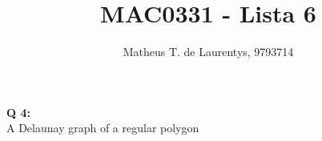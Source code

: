 \documentclass[]{article}
\title{\vspace{-4.0cm}MAC0331 - Lista 6}
\author{Matheus T. de Laurentys, 9793714}
\begin{document}
	\maketitle
	\noindent
	\textbf{Q 4:} \\
	A Delaunay graph of a regular polygon
\end{document}
